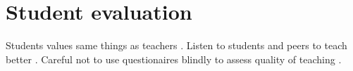 \chapter{Student evaluation}\label{ap:student}

Students values same things as teachers \citep[chapter 6]{Ramsden1992}. Listen to students and peers to teach better \citep[chapter 7]{Ramsden1992}. Careful not to use questionaires blindly to assess quality of teaching \citep[chapter 11]{Ramsden1992}.
